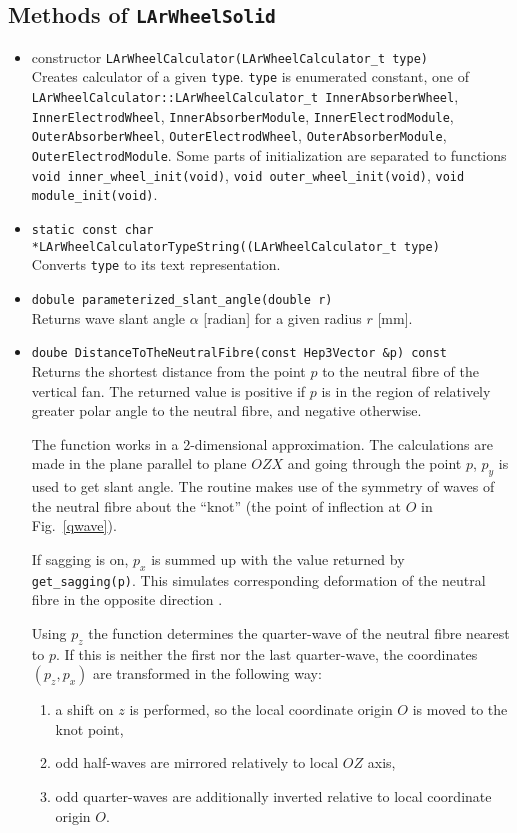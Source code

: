 \documentclass{article}
\begin{document}
\subsection{Methods of {\tt LArWheelSolid}}
\begin{itemize}
\item constructor {\tt LArWheelCalculator(LArWheelCalculator\_t type)}\\
Creates calculator of a given {\tt type}. {\tt type} is enumerated constant,
one of {\tt LArWheelCalculator::LArWheelCalculator\_t InnerAbsorberWheel},
{\tt InnerElectrodWheel}, {\tt InnerAbsorberModule}, {\tt InnerElectrodModule},
{\tt OuterAbsorberWheel}, {\tt OuterElectrodWheel}, {\tt OuterAbsorberModule},
{\tt OuterElectrodModule}. Some parts of initialization are separated to
functions {\tt void inner\_wheel\_init(void)}, {\tt void
outer\_wheel\_init(void)}, {\tt void module\_init(void)}.

\item {\tt static const char *LArWheelCalculatorTypeString((LArWheelCalculator\_t type)}\\
Converts {\tt type} to its text representation.

\item {\tt dobule parameterized\_slant\_angle(double r)}\\
Returns wave slant angle $\alpha$ [radian] for a given radius $r$ [mm].

\item {\tt doube DistanceToTheNeutralFibre(const Hep3Vector \&p) const}\\
Returns the shortest distance from the point $p$ to the neutral fibre of the
vertical fan. The returned value is positive if $p$ is in
the region of relatively greater polar angle to the neutral fibre, and negative
otherwise.

The function works in a 2-dimensional approximation.
The calculations are made in the plane parallel to plane $OZX$ and going through
the point $p$, $p_y$ is used to get slant angle. The routine makes use of the
symmetry of waves of the
neutral fibre about the ``knot'' (the point of inflection at $O$ in
Fig.~\ref{qwave}).

If sagging is on, $p_x$ is summed up with the value returned by {\tt
get\_sagging(p)}. This simulates corresponding deformation of the neutral fibre
in the opposite direction \cite{p3}.

Using $p_z$ the function determines the quarter-wave of the
neutral fibre nearest to $p$. If this is neither the first nor the last
quarter-wave, the coordinates $(p_z, p_x)$ are transformed in the following way:
\begin{enumerate}
\item  a shift on $z$ is performed, so the local coordinate origin
$O$ is moved to the knot point,
\item odd half-waves are mirrored relatively to local $OZ$ axis,
\item odd quarter-waves are additionally inverted relative to
local coordinate origin $O$.
\end{enumerate}


\end{itemize}
\end{document}
